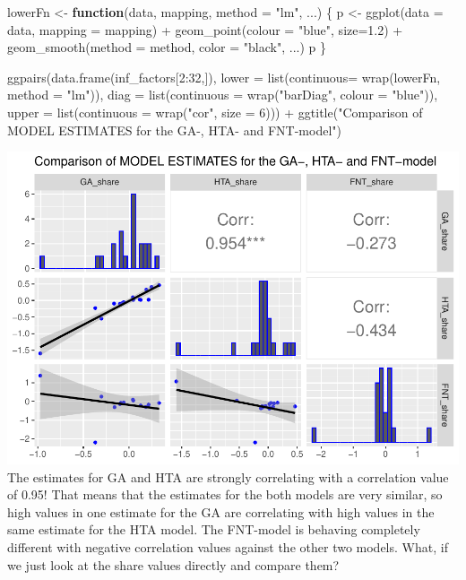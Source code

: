 \documentclass[
]{article}
\newenvironment{Shaded}{\begin{snugshade}}{\end{snugshade}}
\newcommand{\AttributeTok}[1]{\textcolor[rgb]{0.77,0.63,0.00}{#1}}
\newcommand{\ControlFlowTok}[1]{\textcolor[rgb]{0.13,0.29,0.53}{\textbf{#1}}}
\newcommand{\DecValTok}[1]{\textcolor[rgb]{0.00,0.00,0.81}{#1}}
\newcommand{\FloatTok}[1]{\textcolor[rgb]{0.00,0.00,0.81}{#1}}
\newcommand{\FunctionTok}[1]{\textcolor[rgb]{0.00,0.00,0.00}{#1}}
\newcommand{\NormalTok}[1]{#1}
\newcommand{\OtherTok}[1]{\textcolor[rgb]{0.56,0.35,0.01}{#1}}
\newcommand{\SpecialCharTok}[1]{\textcolor[rgb]{0.00,0.00,0.00}{#1}}
\newcommand{\StringTok}[1]{\textcolor[rgb]{0.31,0.60,0.02}{#1}}
\begin{document}
\begin{Shaded}
\begin{Highlighting}[]
\NormalTok{lowerFn }\OtherTok{\textless{}{-}} \ControlFlowTok{function}\NormalTok{(data, mapping, }\AttributeTok{method =} \StringTok{"lm"}\NormalTok{, ...) \{}
\NormalTok{  p }\OtherTok{\textless{}{-}} \FunctionTok{ggplot}\NormalTok{(}\AttributeTok{data =}\NormalTok{ data, }\AttributeTok{mapping =}\NormalTok{ mapping) }\SpecialCharTok{+}
    \FunctionTok{geom\_point}\NormalTok{(}\AttributeTok{colour =} \StringTok{"blue"}\NormalTok{, }\AttributeTok{size=}\FloatTok{1.2}\NormalTok{) }\SpecialCharTok{+}
    \FunctionTok{geom\_smooth}\NormalTok{(}\AttributeTok{method =}\NormalTok{ method, }\AttributeTok{color =} \StringTok{"black"}\NormalTok{, ...)}
\NormalTok{  p}
\NormalTok{\}}


\FunctionTok{ggpairs}\NormalTok{(}\FunctionTok{data.frame}\NormalTok{(inf\_factors[}\DecValTok{2}\SpecialCharTok{:}\DecValTok{32}\NormalTok{,]),}
        \AttributeTok{lower =} \FunctionTok{list}\NormalTok{(}\AttributeTok{continuous=} \FunctionTok{wrap}\NormalTok{(lowerFn, }\AttributeTok{method =} \StringTok{"lm"}\NormalTok{)),}
        \AttributeTok{diag =} \FunctionTok{list}\NormalTok{(}\AttributeTok{continuous =} \FunctionTok{wrap}\NormalTok{(}\StringTok{"barDiag"}\NormalTok{, }\AttributeTok{colour =} \StringTok{"blue"}\NormalTok{)),}
        \AttributeTok{upper =} \FunctionTok{list}\NormalTok{(}\AttributeTok{continuous =} \FunctionTok{wrap}\NormalTok{(}\StringTok{"cor"}\NormalTok{, }\AttributeTok{size =} \DecValTok{6}\NormalTok{))) }\SpecialCharTok{+} 
  \FunctionTok{ggtitle}\NormalTok{(}\StringTok{"Comparison of MODEL ESTIMATES for the GA{-}, HTA{-} and FNT{-}model"}\NormalTok{)}
\end{Highlighting}
\end{Shaded}

\includegraphics{Influence_factors_files/figure-latex/2.32_model_estimates_comparison-1.pdf}
The estimates for GA and HTA are strongly correlating with a correlation
value of 0.95! That means that the estimates for the both models are
very similar, so high values in one estimate for the GA are correlating
with high values in the same estimate for the HTA model. The FNT-model
is behaving completely different with negative correlation values
against the other two models. What, if we just look at the share values
directly and compare them?
\end{document}
